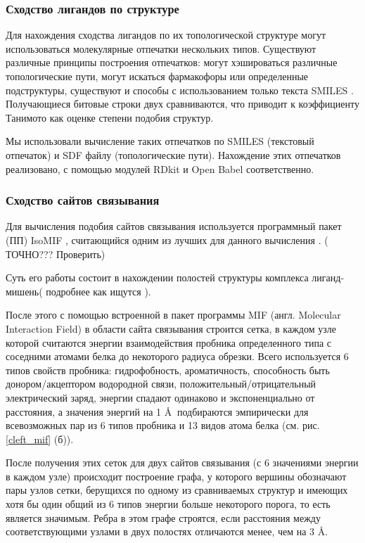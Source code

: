\documentclass[a4paper,14pt]{article}         %
\newcommand{\sic}[1]{\LARGE\color{orange}{#1}\color{black}\Large}
\begin{document}
\subsubsection{Сходство лигандов по структуре}
Для нахождения сходства лигандов по их топологической структуре могут использоваться молекулярные отпечатки нескольких типов. Существуют различные принципы  построения отпечатков: могут хэшироваться различные топологические пути, могут искаться фармакофоры или определенные подструктуры, существуют и способы с использованием только текста SMILES \cite{Cereto-Massague2015}. Получающиеся битовые строки двух сравниваются, что приводит к коэффициенту Танимото как оценке степени подобия структур.

Мы использовали вычисление таких отпечатков по SMILES (текстовый отпечаток) и SDF файлу (топологические пути). Нахождение этих отпечатков реализовано,  с помощью модулей RDkit \cite{rdkit} и Open Babel \cite{openbabel} соответственно. \sic{Не представляет сложности при необходимости добавить другие типы, например, из тех же модулей.}

\subsubsection{Сходство сайтов связывания}
Для вычисления подобия сайтов связывания используется программный пакет (ПП) IsoMIF \cite{isomif, Chartier2015}, считающийся одним из лучших для данного вычисления \cite{Ehrt2016}. (\color{orange} ТОЧНО??? Проверить\color{black})

Суть его работы состоит в нахождении полостей структуры комплекса лиганд-мишень\cite{Gaudreault2015, Laskowski1995}(\color{orange} подробнее как ищутся \color{black}). 

После этого с помощью встроенной в пакет программы MIF (англ. Molecular Interaction Field) в области сайта связывания строится сетка, в каждом узле которой считаются энергии взаимодействия пробника определенного типа с соседними атомами белка до некоторого радиуса обрезки. Всего используется 6 типов свойств пробника: гидрофобность, ароматичность, способность быть донором/акцептором водородной связи, положительный/отрицательный электрический заряд, энергии спадают одинаково и экспоненциально от расстояния, а значения энергий на 1 \AA $\:$ подбираются эмпирически для всевозможных пар из 6 типов пробника и 13 видов атома белка (см. рис. \ref{cleft_mif} (б)).

После получения этих сеток для двух сайтов связывания (с 6 значениями энергии в каждом узле) происходит построение графа, у которого вершины обозначают пары узлов сетки, берущихся по одному из сравниваемых структур и имеющих хотя бы один общий из 6 типов энергии больше некоторого порога, то есть является значимым. Ребра в этом графе строятся, если расстояния между соответствующими узлами в двух полостях отличаются менее, чем на 3 \AA. 
\end{document}

